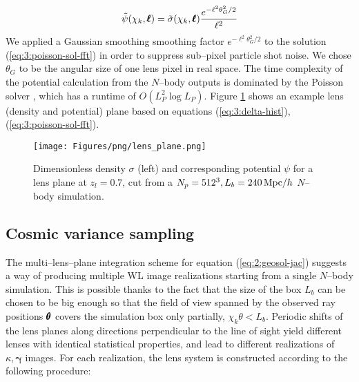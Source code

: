 \begin{equation}
\label{eq:3:poisson-sol-fft}
\tilde{\psi}(\chi_k,\pmb{\ell}) = \tilde{\sigma}(\chi_k,\pmb{\ell})\frac{e^{-\ell^2\theta_G^2/2}}{\ell^2}
\end{equation} 
%
We applied a Gaussian smoothing smoothing factor $e^{-\ell^2\theta_G^2/2}$ to the solution (\ref{eq:3:poisson-sol-fft}) in order to suppress sub--pixel particle shot noise. We chose $\theta_G$ to be the angular size of one lens pixel in real space. The time complexity of the potential calculation from the $N$--body outputs is dominated by the Poisson solver \citep{lenstools}, which has a runtime of $O(L_P^2\log L_P)$. Figure \ref{fig:3:lens} shows an example lens (density and potential) plane based on equations (\ref{eq:3:delta-hist}), (\ref{eq:3:poisson-sol-fft}). 

\begin{figure}
\begin{center}
\texttt{[image: Figures/png/lens\_plane.png]}
\end{center}
\caption{Dimensionless density $\sigma$ (left) and corresponding potential $\psi$ for a lens plane at $z_l=0.7$, cut from a $N_p=512^3, L_b=240\,{\rm Mpc}/h$ $N$--body simulation.}
\label{fig:3:lens}
\end{figure}

\subsection{Cosmic variance sampling}
\label{sec:3:sampling}
The multi--lens--plane integration scheme for equation (\ref{eq:2:geosol-jac}) suggests a way of producing multiple WL image realizations starting from a single $N$--body simulation. This is possible thanks to the fact that the size of the box $L_b$ can be chosen to be big enough so that the field of view spanned by the observed ray positions $\pmb{\theta}$ covers the simulation box only partially, $\chi_k\theta<L_b$. Periodic shifts of the lens planes along directions perpendicular to the line of sight yield different lenses with identical statistical properties, and lead to different realizations of $\kappa,\pmb{\gamma}$ images. For each realization, the lens system is constructed according to the following procedure:

